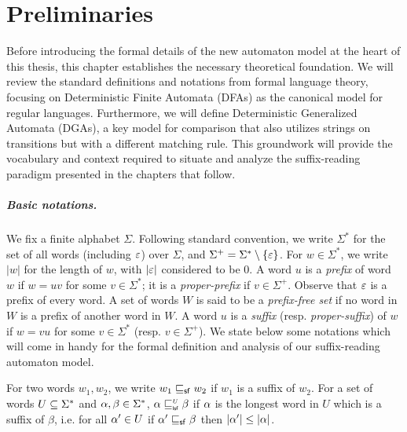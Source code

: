 \chapter{Preliminaries}
\label{sec:preliminaries}

Before introducing the formal details of the new automaton model at the heart of this thesis, this chapter establishes the necessary theoretical foundation. We will review the standard definitions and notations from formal language theory, focusing on Deterministic Finite Automata (DFAs) as the canonical model for regular languages. Furthermore, we will define Deterministic Generalized Automata (DGAs), a key model for comparison that also utilizes strings on transitions but with a different matching rule. This groundwork will provide the vocabulary and context required to situate and analyze the suffix-reading paradigm presented in the chapters that follow.

\paragraph*{Basic notations.} We fix a finite alphabet $\Sigma$. Following standard convention, we
write $\Sigma^*$ for the set of all words (including $\varepsilon$) over
$\Sigma$, and $\Sigma^+ = \Sigma^* \setminus \{ \varepsilon\}$. For
$w \in \Sigma^*$, we write $|w|$ for the length of $w$, with $|\varepsilon|$
considered to be $0$.  A word $u$ is a \emph{prefix} of word $w$ if
$w = u v$ for some $v \in \Sigma^*$; it is a \emph{proper-prefix} if
$v \in \Sigma^+$. Observe that $\varepsilon$ is a prefix of every word. A set
of words $W$ is said to be a \emph{prefix-free set} if no word in $W$
is a prefix of another word in $W$. A word $u$ is a
\emph{suffix} (resp. \emph{proper-suffix}) of $w$ if $w = vu$ for some
$v \in \Sigma^*$ (resp. $v \in \Sigma^+$). We state below some notations which will come in handy for the formal definition and analysis of our suffix-reading automaton model.

\begin{definition}
  \label{def:notation}
  For two words $w_1, w_2$, we write $w_1 \sqsubseteq_{\mathsf {sf}} w_2$ if $w_1$
   is a suffix of $w_2$. For a set of words $U \subseteq \Sigma^*$ and $\alpha, \beta \in \Sigma^*$,
 $\alpha \sqsubseteq_{\scriptscriptstyle \mathsf{lsf}}^{\scriptscriptstyle U} \beta$ if $\alpha$ is the longest word in $U$ which is a
 suffix of $\beta$, i.e. for all $\alpha' \in U$ if $\alpha' \sqsubseteq_{\mathsf {sf}} \beta$ then
 $|\alpha'| \leq |\alpha|$.


\end{definition}


